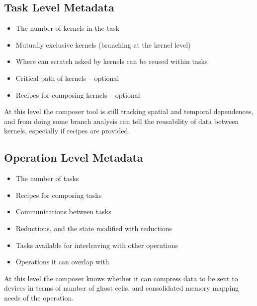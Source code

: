 \documentclass{article}
\begin{document}
\subsection{Task Level Metadata}
\begin{itemize}
\item The number of kernels in the task
\item Mutually exclusive kernels (branching at the kernel level)
\item Where can scratch asked by kernels can be reused within tasks
\item Critical path of kernels -- optional 
\item Recipes for composing kernels -- optional
\end{itemize}
At this level the composer tool is still tracking spatial and temporal
dependences, and from doing some branch analysis can tell the
reusability of data between kernels, especially if recipes are
provided. 

\subsection{Operation Level Metadata}
\begin{itemize}
\item The number of tasks
\item Recipes for composing tasks
\item Communications between tasks
\item Reductions, and the state modified with reductions
\item Tasks available for interleaving with other operations 
\item Operations it can overlap with
\end{itemize}
At this level the composer knows whether it can compress data to be
sent to devices in terms of number of ghost cells, and consolidated
memory mapping needs of the operation.
\end{document}
